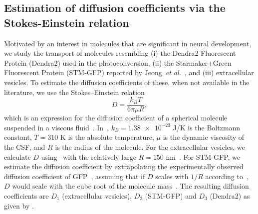 \documentclass{WileyMSP-template}
\begin{document}
\subsection{Estimation of diffusion coefficients via the Stokes-Einstein relation}
Motivated by an interest in molecules that are significant in neural development,
we study the transport of molecules resembling (i) the Dendra2 Fluorescent Protein (Dendra2)
used in the photoconversion, (ii) the Starmaker+Green Fluorescent Protein (STM-GFP) reported by
Jeong~\emph{et al.}~\cite{Jeong2024TheZebrafish}, and (iii) extracellular vesicles.
To estimate the diffusion coefficients of these, when not
available in the literature, we use the Stokes--Einstein relation
\begin{equation}
    D = \frac{k_B T}{6\pi \mu R},
    \label{eq:D_stokes_einstein}
\end{equation}
which is an expression for the diffusion coefficient of a spherical
molecule suspended in a viscous fluid~\cite{Einstein1905UberTeilchen}.
In~, $k_B = \num{1.38e-23}$ J/K is the Boltzmann constant,
$T = 310$ K is the absolute temperature, $\mu$ is the dynamic viscosity of the
CSF, and $R$ is the radius of the molecule.
For the extracellular vesicles, we calculate $D$ using~
with the relatively large $R=150$ nm~\cite{Moghassemi2024ExtracellularDecade}.
For STM-GFP, we estimate the diffusion coefficient by extrapolating
the experimentally observed diffusion coefficient of
GFP~\cite{Swaminathan1997PhotobleachingDiffusion, Potma2001ReducedCells},
assuming that if $D$ scales with $1/R$ according to~,
$D$ would scale with the cube root of the molecule mass~\cite{Goodhill1997DiffusionGuidance}.
The resulting diffusion coefficients
are $D_1$ (extracellular vesicles), $D_2$ (STM-GFP) and $D_3$ (Dendra2) as given by .
\end{document}

